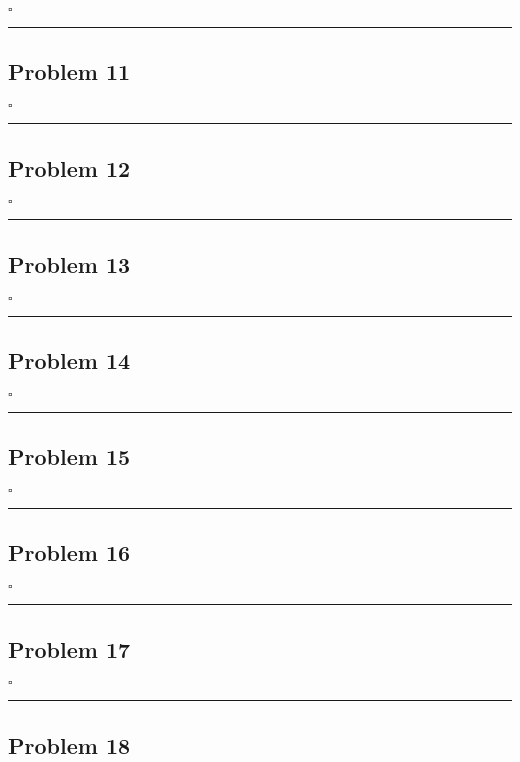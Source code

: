 \documentclass[12pt]{article}
\newcommand*{\QEDB}{\hfill\ensuremath{\square}}
\newcommand{\horrule}[1]{\rule{\linewidth}{#1}}
\begin{document}
\QEDB

\horrule{0.5pt}

\subsection*{Problem 11}

\QEDB

\horrule{0.5pt}

\subsection*{Problem 12}

\QEDB

\horrule{0.5pt}

\subsection*{Problem 13}

\QEDB

\horrule{0.5pt}

\subsection*{Problem 14}

\QEDB

\horrule{0.5pt}

\subsection*{Problem 15}

\QEDB

\horrule{0.5pt}

\subsection*{Problem 16}

\QEDB

\horrule{0.5pt}

\subsection*{Problem 17}

\QEDB

\horrule{0.5pt}

\subsection*{Problem 18}
\end{document}
